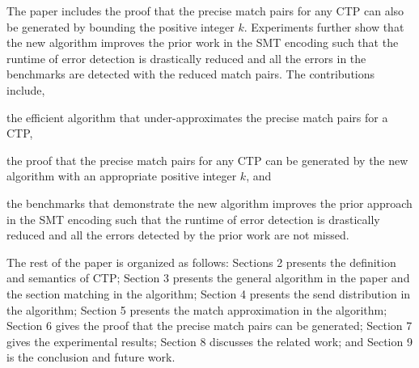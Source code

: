 

The paper includes the proof that the precise match pairs for any CTP can also be generated by bounding the positive integer $k$. Experiments further show that the new algorithm improves the prior work in the SMT encoding such that the runtime of error detection is drastically reduced and all the errors in the benchmarks are detected with the reduced match pairs.
The contributions include,
\begin{compactitem}
\item the efficient algorithm that under-approximates the precise match pairs for a CTP, 
\item the proof that the precise match pairs for any CTP can be generated by the new algorithm with an appropriate positive integer $k$, and
\item the benchmarks that demonstrate the new algorithm improves the prior approach in the SMT encoding such that the runtime of error detection is drastically reduced and all the errors detected by the prior work are not missed. 
\end{compactitem}

The rest of the paper is organized as follows: 
Sections 2 presents the definition and semantics of CTP; Section 3 presents the general algorithm in the paper and the section matching in the algorithm; Section 4 presents the send distribution in the algorithm; Section 5 presents the match approximation in the algorithm; Section 6 gives the proof that the precise match pairs can be generated; Section 7 gives the experimental results; Section 8 discusses the related work; and Section 9 is the conclusion and future work.
